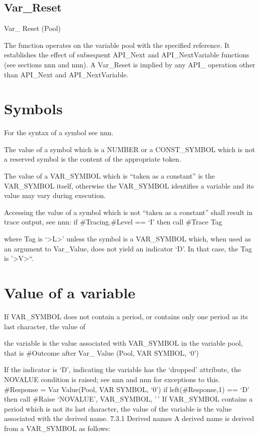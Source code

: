\subsection{Var\_Reset}\label{var_reset}

Var\_ Reset (Pool)

The function operates on the variable pool with the specified reference.
It establishes the effect of subsequent API\_Next and API\_NextVariable
functions (see sections nnn and nnn). A Var\_Reset is implied by any
API\_ operation other than API\_Next and API\_NextVariable.

\section{Symbols}\label{symbols}

For the syntax of a symbol see nnn.

The value of a symbol which is a NUMBER or a CONST\_SYMBOL which is not
a reserved symbol is the content of the appropriate token.

The value of a VAR\_SYMBOL which is ``taken as a constant'' is the
VAR\_SYMBOL itself, otherwise the VAR\_SYMBOL identifies a variable and
its value may vary during execution.

Accessing the value of a symbol which is not ``taken as a constant''
shall result in trace output, see nnn: if \#Tracing.\#Level == `I' then
call \#Trace Tag

where Tag is `\textgreater L\textgreater{}' unless the symbol is a
VAR\_SYMBOL which, when used as an argument to Var\_Value, does not
yield an indicator `D'. In that case, the Tag is
'\textgreater V\textgreater``.

\section{Value of a variable}\label{value-of-a-variable}

If VAR\_SYMBOL does not contain a period, or contains only one period as
its last character, the value of

the variable is the value associated with VAR\_SYMBOL in the variable
pool, that is \#Outcome after Var\_ Value (Pool, VAR SYMBOL, `0')

If the indicator is `D', indicating the variable has the `dropped'
attribute, the NOVALUE condition is raised; see nnn and nnn for
exceptions to this. \#Response = Var Value(Pool, VAR SYMBOL, `0') if
left(\#Response,1) == `D' then call \#Raise `NOVALUE', VAR\_SYMBOL, '\,'
If VAR\_SYMBOL contains a period which is not its last character, the
value of the variable is the value associated with the derived name.
7.3.1 Derived names A derived name is derived from a VAR\_SYMBOL as
follows:

